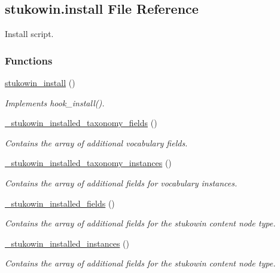 \hypertarget{stukowin_8install}{\subsection{stukowin.\+install File Reference}
\label{stukowin_8install}
}


Install script.  


\subsubsection*{Functions}
\begin{DoxyCompactItemize}
\item 
\hyperlink{group___stukowin___module_ga67989d3a763f2efa2fc0b07460639558}{stukowin\+\_\+install} ()
\begin{DoxyCompactList}\small\item\em Implements hook\+\_\+install(). \end{DoxyCompactList}\item 
\hyperlink{group___stukowin___module_ga0dbd0252e3db9efdb3cfefbefecf3d2e}{\+\_\+stukowin\+\_\+installed\+\_\+taxonomy\+\_\+fields} ()
\begin{DoxyCompactList}\small\item\em Contains the array of additional vocabulary fields. \end{DoxyCompactList}\item 
\hyperlink{group___stukowin___module_gafd634a2fb5766e1053fa7df79ab11c79}{\+\_\+stukowin\+\_\+installed\+\_\+taxonomy\+\_\+instances} ()
\begin{DoxyCompactList}\small\item\em Contains the array of additional fields for vocabulary instances. \end{DoxyCompactList}\item 
\hyperlink{group___stukowin___module_ga5eda7b9b561e8a5ad87df0bb50cf80b0}{\+\_\+stukowin\+\_\+installed\+\_\+fields} ()
\begin{DoxyCompactList}\small\item\em Contains the array of additional fields for the stukowin content node type. \end{DoxyCompactList}\item 
\hyperlink{group___stukowin___module_ga473e908d001c086718d6675f19cb7ee7}{\+\_\+stukowin\+\_\+installed\+\_\+instances} ()
\begin{DoxyCompactList}\small\item\em Contains the array of additional fields for the stukowin content node type. \end{DoxyCompactList}\item 

\end{DoxyCompactItemize}
